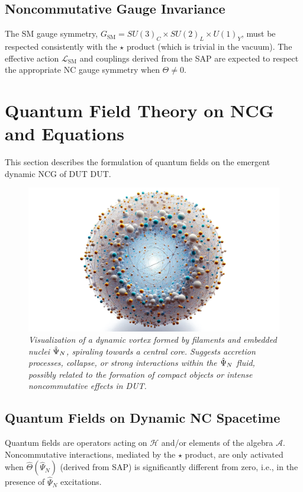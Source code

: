 \documentclass[11pt, a4paper]{article}
\theoremstyle{remark}
\newcommand{\Op}[1]{\hat{#1}}
\begin{document}
\subsection{Noncommutative Gauge Invariance}
\label{subsec:nc_gauge_invariance_final}
The SM gauge symmetry, \(G_{\text{SM}} = SU(3)_C \times SU(2)_L \times U(1)_Y\), must be respected consistently with the \( \star \) product (which is trivial in the vacuum). The effective action \( \mathcal{L}_{\text{SM}} \) and couplings derived from the SAP are expected to respect the appropriate NC gauge symmetry when \( \Theta \neq 0 \).

\section{Quantum Field Theory on NCG and Equations}
\label{sec:qft_nc_final}

This section describes the formulation of quantum fields on the emergent dynamic NCG of DUT DUT.

\begin{figure}[htbp]
    \centering
    \includegraphics[width=0.5\linewidth]{OIG14.ZNLJ.PNG}
    \caption{%
      \footnotesize\textit{Visualization of a dynamic vortex formed by filaments and embedded nuclei \(\protect\Op{\Psi}_N\), spiraling towards a central core. Suggests accretion processes, collapse, or strong interactions within the \(\protect\Op{\Psi}_N\) fluid, possibly related to the formation of compact objects or intense noncommutative effects in DUT.}
    }
    \label{fig:Figura7}
\end{figure}

\subsection{Quantum Fields on Dynamic NC Spacetime}
\label{subsec:qft_fields_final_revised}
Quantum fields are operators acting on \( \mathcal{H} \) and/or elements of the algebra \( \mathcal{A} \). Noncommutative interactions, mediated by the \( \star \) product, are only activated when \( \Op{\Theta}(\Op{\Psi}_N) \) (derived from SAP) is significantly different from zero, i.e., in the presence of \( \Op{\Psi}_N \) excitations.
\end{document}
